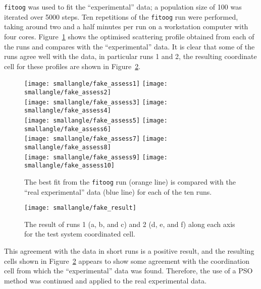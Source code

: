 \texttt{fitoog} was used to fit the ``experimental'' data; a population size of 100 was iterated over 5000 steps.
Ten repetitions of the \texttt{fitoog} run were performed, taking around two and a half minutes per run on a workstation computer with four cores.
Figure~\ref{fig:test_assess} shows the optimised scattering profile obtained from each of the runs and compares with the ``experimental'' data.
It is clear that some of the runs agree well with the data, in particular runs 1 and 2, the resulting coordinate cell for these profiles are shown in Figure~\ref{fig:fake_result}.
%
\begin{figure}
    \centering
    \texttt{[image: smallangle/fake\_assess1]}
    \texttt{[image: smallangle/fake\_assess2]} \\
    \texttt{[image: smallangle/fake\_assess3]}
    \texttt{[image: smallangle/fake\_assess4]} \\
    \texttt{[image: smallangle/fake\_assess5]}
    \texttt{[image: smallangle/fake\_assess6]} \\
    \texttt{[image: smallangle/fake\_assess7]}
    \texttt{[image: smallangle/fake\_assess8]} \\
    \texttt{[image: smallangle/fake\_assess9]}
    \texttt{[image: smallangle/fake\_assess10]}
    \caption{The best fit from the \texttt{fitoog} run (orange line) is compared with the ``real experimental'' data (blue line) for each of the ten runs.}
    \label{fig:test_assess}
\end{figure}
%
%
\begin{figure}
    \centering
    \texttt{[image: smallangle/fake\_result]}
    \caption{The result of runs 1 (a, b, and c) and 2 (d, e, and f) along each axis for the test system coordinated cell.}
    \label{fig:fake_result}
\end{figure}
%

This agreement with the data in short runs is a positive result, and the resulting cells shown in Figure~\ref{fig:fake_result} appears to show some agreement with the coordination cell from which the ``experimental'' data was found.
Therefore, the use of a PSO method was continued and applied to the real experimental data.

